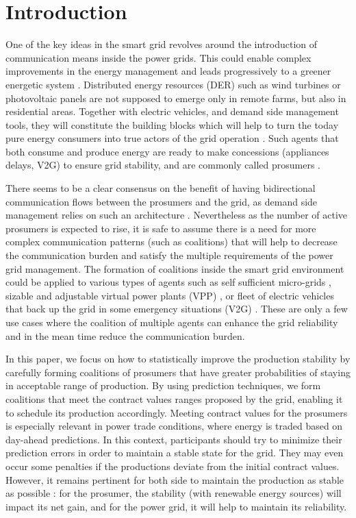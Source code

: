 \documentclass[conference]{IEEEtran}
\begin{document}
\section{Introduction}
\label{sec:introduction}

One of the key ideas in the smart grid revolves around the introduction of communication means inside the power grids. This could enable complex improvements in the energy management and leads progressively to a greener energetic system \cite{Ramchurn} \cite{WuHamedHuangBook2011}. Distributed energy resources (DER) such as wind turbines or photovoltaic panels are not supposed to emerge only in remote farms, but also in residential areas. Together with electric vehicles, and demand side management tools, they will constitute the building blocks which will help to turn the today pure energy consumers into true actors of the grid operation \cite{Ramchurn}. Such agents that both consume and produce energy are ready to make concessions (appliances delays, V2G) to ensure grid stability, and are commonly called prosumers \cite{Rathnayaka2012} \cite{Ramchurn}.

There seems to be a clear consensus on the benefit of having bidirectional communication flows between the prosumers and the grid, as demand side management relies on such an architecture \cite{WuHamedHuangBook2011}. Nevertheless as the number of active prosumers is expected to rise, it is safe to assume there is a need for more complex communication patterns (such as coalitions) that will help to decrease the communication burden and satisfy the multiple requirements of the power grid management. The formation of coalitions inside the smart grid environment could be applied to various types of agents such as self sufficient micro-grids \cite{Pahwa}, sizable and adjustable virtual power plants (VPP) \cite{Braun, Ramchurn}, or fleet of electric vehicles that back up the grid in some emergency situations (V2G) \cite{Ramchurn}. These are only a few use cases where the coalition of multiple agents can enhance the grid reliability and in the mean time reduce the communication burden.

In this paper, we focus on how to statistically improve the production stability by carefully forming coalitions of prosumers that have greater probabilities of staying in acceptable range of production. By using prediction techniques, we form coalitions that meet the contract values ranges proposed by the grid, enabling it to schedule its production accordingly. Meeting contract values for the prosumers is especially relevant in power trade conditions, where energy is traded based on day-ahead predictions. In this context, participants should try to minimize their prediction errors in order to maintain a stable state for the grid. They may even occur some penalties if the productions deviate from the initial contract values. However, it remains pertinent for both side to maintain the production as stable as possible : for the prosumer, the stability (with renewable energy sources) will impact its net gain, and for the power grid, it will help to maintain its reliability.
\end{document}
